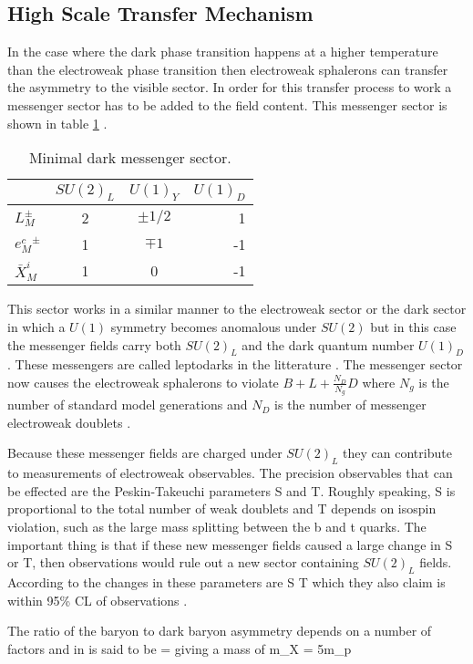 \subsection{High Scale Transfer Mechanism}
In the case where the dark phase transition happens at a higher temperature than the electroweak phase transition then electroweak sphalerons can transfer the 
asymmetry to the visible sector. In order for this transfer process to work a messenger sector has to be added to the field content. This messenger sector is 
shown in table \ref{messenger} \cite{darko}.
\begin{table}[h]
\centering
\begin{tabular}{l | c | c | r} 
    \label{messenger}
         & $SU(2)_L$  &  $U(1)_Y$ & $U(1)_D$ \\
    \hline
    $L_M^{\pm}$ & 2 & $\pm 1/2$ & 1  \\
    ${e_M^c}^{\pm}$  & 1 & $\mp 1$ &  -1  \\
    $\bar{X}_{M}^i$ & 1 & 0 & -1  
\end{tabular}
\caption{Minimal dark messenger sector.}
\end{table}
This sector works in a similar manner to the electroweak sector or the dark sector in which a $U(1)$ symmetry becomes anomalous under $SU(2)$ but in this case the 
messenger fields carry both $SU(2)_L$ and the dark quantum number $U(1)_D$. These messengers are called leptodarks in the litterature \cite{darko}. The messenger 
sector now causes the electroweak sphalerons to violate $B+L+\frac{N_D}{N_g}D$ where $N_g$ is the number of standard model generations and $N_D$ is the number of 
messenger electroweak doublets \cite{darko}.

Because these 
messenger fields are charged under $SU(2)_L$ they can contribute to measurements of electroweak observables. The precision observables that can be effected are 
the Peskin-Takeuchi parameters S and T. Roughly speaking, S is proportional to the total number of weak doublets and T depends on isospin violation, such as the large 
mass splitting between the b and t quarks\cite{ewparam}. The important thing is that if these new messenger fields caused a large change in S or T, then observations 
would rule out a new sector containing $SU(2)_L$ fields. According to \cite{darko} the changes in these parameters are
\beq
    \Delta S  \text{ , } \Delta T 
\eeq
which they also claim is within 95\% CL of observations \cite{obs1}.

The ratio of the baryon to dark baryon asymmetry depends on a number of factors and in \cite{darko} is said to be
\beq
     = 
\eeq
giving a mass of
\beq
    m_X = 5m_p  
\eeq





